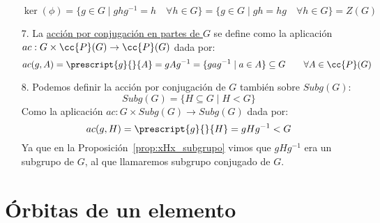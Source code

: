 \begin{ejemplo}
\begin{enumerate}
\begin{equation*}
                \ker(\phi) = \{g\in G \mid ghg^{-1} = h \quad \forall h\in G\} = \{g\in G \mid gh = hg \quad \forall h\in G\} = Z(G)
            \end{equation*}
        \item[7.] La \underline{acción por conjugación en partes de $G$} se define como la aplicación \newline $ac:G\times \cc{P}(G) \to \cc{P}(G)$ dada por:
            \begin{equation*}
                ac(g,A) = \prescript{g}{}{A} = gAg^{-1} = \{gag^{-1} \mid a\in A\} \subseteq G \qquad \forall A\in \cc{P}(G)
            \end{equation*}
        \item[8.] Podemos definir la acción por conjugación de $G$ también sobre $Subg(G)$:
            \begin{equation*}
                Subg(G) = \{H\subseteq G \mid H<G\}
            \end{equation*}
            Como la aplicación $ac:G\times Subg(G) \to Subg(G)$ dada por:
            \begin{equation*}
                ac(g,H) = \prescript{g}{}{H} = gHg^{-1} < G
            \end{equation*}
            Ya que en la Proposición~\ref{prop:xHx_subgrupo} vimos que $gHg^{-1}$ era un subgrupo de $G$, al que llamaremos subgrupo conjugado de $G$.
    \end{enumerate}
\end{ejemplo}

\section{Órbitas de un elemento}

